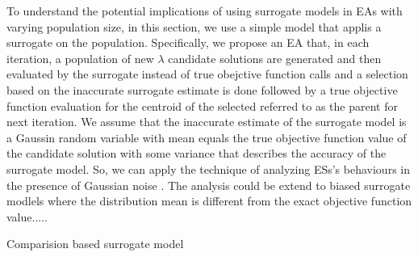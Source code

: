 
To understand the potential implications of using surrogate models in EAs with varying population size, in this section, we use a simple model that applis a surrogate on the population. Specifically, we propose an EA that, in each iteration, a population of new $\lambda$ candidate solutions are generated and then evaluated by the surrogate instead of true obejctive function calls and a selection based on the inaccurate surrogate estimate is done followed by a true objective function evaluation for the centroid of the selected referred to as the parent for next iteration. We assume that the inaccurate estimate of the surrogate model is a Gaussin random variable with mean equals the true objective function value of the candidate solution with some variance that describes the accuracy of the surrogate model. So, we can apply the technique of analyzing ESs's behaviours in the presence of Gaussian noise \cite{arnold2002noisy}. The analysis could be extend to biased surrogate modlels where the distribution mean is different from the exact objective function value\cite{DBLP:conf/ppsn/KayhaniA18}.....


Comparision based surrogate model 


